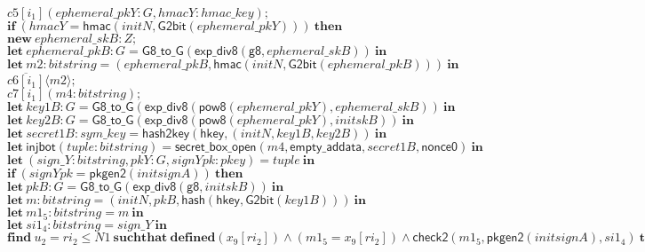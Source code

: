 \documentclass{article}
\newcommand{\cinput}[2]{{#1}({#2})}
\newcommand{\coutput}[2]{\overline{#1}\langle{#2}\rangle}
\newcommand{\kw}[1]{\mathbf{#1}}
\newcommand{\kwf}[1]{\mathsf{#1}}
\newcommand{\var}[1]{\mathit{#1}}
\newcommand{\kwt}[1]{\mathit{#1}}
\newcommand{\kwp}[1]{\mathit{#1}}
\newcommand{\kwc}[1]{\mathit{#1}}
\begin{document}
\begin{tabbing}
\>$\quad \cinput{\kwc{c5}[\var{i}_{1}]}{\var{ephemeral{\_}pkY}: \kwt{G}, \var{hmacY}: \kwt{hmac{\_}key}};$\\
\>$\quad \kw{if}\ (\var{hmacY}  =  \kwf{hmac}(\var{initN}, \kwf{G2bit}(\var{ephemeral{\_}pkY})))\ \kw{then}$\\
\>$\quad \kw{new}\ \var{ephemeral{\_}skB}: \kwt{Z};$\\
\>$\quad \kw{let}\ \var{ephemeral{\_}pkB}: \kwt{G} = \kwf{G8{\_}to{\_}G}(\kwf{exp{\_}div8}(\kwf{g8}, \var{ephemeral{\_}skB}))\ \kw{in}$\\
\>$\quad \kw{let}\ \var{m2}: \kwt{bitstring} = \kwf{}(\var{ephemeral{\_}pkB}, \kwf{hmac}(\var{initN}, \kwf{G2bit}(\var{ephemeral{\_}pkB})))\ \kw{in}$\\
\>$\quad \coutput{\kwc{c6}[\var{i}_{1}]}{\var{m2}};$\\
\>$\quad \cinput{\kwc{c7}[\var{i}_{1}]}{\var{m4}: \kwt{bitstring}};$\\
\>$\quad \kw{let}\ \var{key1B}: \kwt{G} = \kwf{G8{\_}to{\_}G}(\kwf{exp{\_}div8}(\kwf{pow8}(\var{ephemeral{\_}pkY}), \var{ephemeral{\_}skB}))\ \kw{in}$\\
\>$\quad \kw{let}\ \var{key2B}: \kwt{G} = \kwf{G8{\_}to{\_}G}(\kwf{exp{\_}div8}(\kwf{pow8}(\var{ephemeral{\_}pkY}), \var{initskB}))\ \kw{in}$\\
\>$\quad \kw{let}\ \var{secret1B}: \kwt{sym{\_}key} = \kwf{hash2key}(\kwf{hkey}, \kwf{}(\var{initN}, \var{key1B}, \var{key2B}))\ \kw{in}$\\
\>$\quad \kw{let}\ \kwf{injbot}(\var{tuple}: \kwt{bitstring}) = \kwf{secret{\_}box{\_}open}(\var{m4}, \kwf{empty{\_}addata}, \var{secret1B}, \kwf{nonce0})\ \kw{in}$\\
\>$\quad \kw{let}\ \kwf{}(\var{sign{\_}Y}: \kwt{bitstring}, \var{pkY}: \kwt{G}, \var{signYpk}: \kwt{pkey}) = \var{tuple}\ \kw{in}$\\
\>$\quad \kw{if}\ (\var{signYpk}  =  \kwf{pkgen2}(\var{initsignA}))\ \kw{then}$\\
\>$\quad \kw{let}\ \var{pkB}: \kwt{G} = \kwf{G8{\_}to{\_}G}(\kwf{exp{\_}div8}(\kwf{g8}, \var{initskB}))\ \kw{in}$\\
\>$\quad \kw{let}\ \var{m}: \kwt{bitstring} = \kwf{}(\var{initN}, \var{pkB}, \kwf{hash}(\kwf{hkey}, \kwf{G2bit}(\var{key1B})))\ \kw{in}$\\
\>$\quad \kw{let}\ \var{m1}_{5}: \kwt{bitstring} = \var{m}\ \kw{in}$\\
\>$\quad \kw{let}\ \var{si1}_{4}: \kwt{bitstring} = \var{sign{\_}Y}\ \kw{in}$\\
\>$\quad \kw{find}\ \var{u}_{2} = \var{ri}_{2} \leq \kwp{N1}\ \kw{suchthat}\ \kw{defined}(\var{x}_{9}[\var{ri}_{2}])\wedge (\var{m1}_{5}  =  \var{x}_{9}[\var{ri}_{2}]) \wedge  \kwf{check2}(\var{m1}_{5}, \kwf{pkgen2}(\var{initsignA}), \var{si1}_{4})\ \kw{then}$\\

\end{tabbing}
\end{document}

